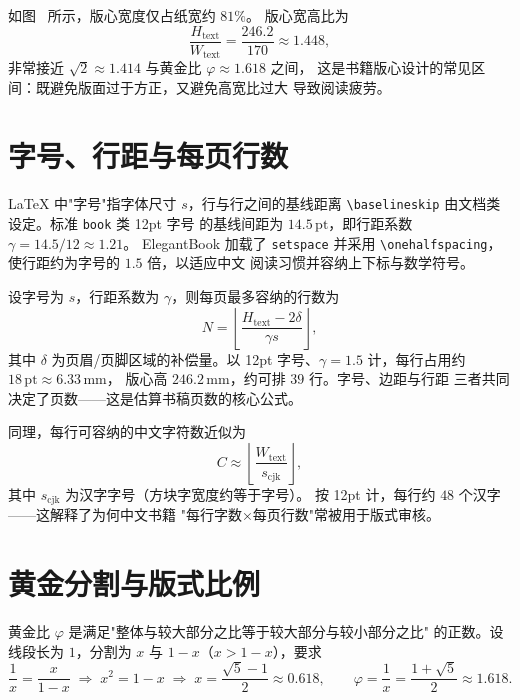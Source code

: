 如图~ 所示，版心宽度仅占纸宽约 $81\%$。
版心宽高比为
\begin{equation}
  \frac{H_{\mathrm{text}}}{W_{\mathrm{text}}}
  = \frac{246.2}{170} \approx 1.448,
\end{equation}
非常接近 $\sqrt{2}\approx1.414$ 与黄金比 $\varphi\approx1.618$ 之间，
这是书籍版心设计的常见区间：既避免版面过于方正，又避免高宽比过大
导致阅读疲劳。

\section{字号、行距与每页行数}

LaTeX 中"字号"指字体尺寸 $s$，行与行之间的基线距离
\verb|\baselineskip| 由文档类设定。标准 \texttt{book} 类 12pt 字号
的基线间距为 $14.5\,\mathrm{pt}$，即行距系数 $\gamma = 14.5/12\approx1.21$。
ElegantBook 加载了 \texttt{setspace} 并采用
\verb|\onehalfspacing|，使行距约为字号的 $1.5$ 倍，以适应中文
阅读习惯并容纳上下标与数学符号。

\begin{remark}
设字号为 $s$，行距系数为 $\gamma$，则每页最多容纳的行数为
\begin{equation}
  N = \left\lfloor \frac{H_{\mathrm{text}} - 2\delta}{\gamma s} \right\rfloor,
  \label{eq:lines}
\end{equation}
其中 $\delta$ 为页眉/页脚区域的补偿量。以 12pt 字号、$\gamma=1.5$
计，每行占用约 $18\,\mathrm{pt}\approx6.33\,\mathrm{mm}$，
版心高 $246.2\,\mathrm{mm}$，约可排 $39$ 行。字号、边距与行距
三者共同决定了页数——这是估算书稿页数的核心公式。
\end{remark}

同理，每行可容纳的中文字符数近似为
\begin{equation}
  C \approx \left\lfloor \frac{W_{\mathrm{text}}}{s_{\mathrm{cjk}}} \right\rfloor,
  \label{eq:chars}
\end{equation}
其中 $s_{\mathrm{cjk}}$ 为汉字字号（方块字宽度约等于字号）。
按 12pt 计，每行约 $48$ 个汉字——这解释了为何中文书籍
"每行字数×每页行数"常被用于版式审核。

\section{黄金分割与版式比例}

黄金比 $\varphi$ 是满足"整体与较大部分之比等于较大部分与较小部分之比"
的正数。设线段长为 $1$，分割为 $x$ 与 $1-x$（$x>1-x$），要求
\begin{equation}
  \frac{1}{x} = \frac{x}{1-x}
  \;\Longrightarrow\;
  x^2 = 1-x
  \;\Longrightarrow\;
  x = \frac{\sqrt{5}-1}{2} \approx 0.618,
  \qquad
  \varphi = \frac{1}{x} = \frac{1+\sqrt{5}}{2} \approx 1.618.
  \label{eq:golden}
\end{equation}

